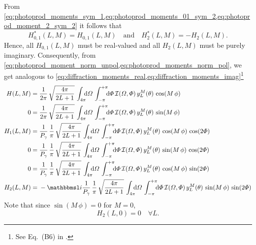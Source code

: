 From
\cref{eq:photoprod_moments_sym_1,eq:photoprod_moments_01_sym_2,eq:photoprod_moment_2_sym_2}
it follows that
\begin{equation}
  \label{eq:photoprodP_moments_real_imag}
  H_{0, 1}^*(L, M) = H_{0, 1}(L, M)
  \quad\text{and}\quad
  H_2^*(L, M) = -H_2(L, M).
\end{equation}
Hence, all $H_{0, 1}(L, M)$ must be real-valued and all $H_2(L, M)$
must be purely imaginary.  Consequently, from
\cref{eq:photoprod_moment_norm_unpol,eq:photoprod_moments_norm_pol},
we get analogous to
\cref{eq:diffraction_moments_real,eq:diffraction_moments_imag}\footnote{See
Eq.~(B6) in .}
\begin{align}
  \label{eq:photoprod_moment_0_real}
  H(L, M)
  ={}& \frac{1}{2 \pi}\, \sqrt{\frac{4 \pi}{2 L + 1}}\, \int_{4 \pi}\!\!\! \dif{\Omega}\, \int_{-\pi}^{+\pi}\!\!\! \dif{\Phi}\,
  \mathcal{I}(\Omega, \Phi)\, y_L^M(\theta)\, \cos(M\, \phi)
  \\
  \label{eq:photoprod_moment_0_imag}
  0
  ={}& \frac{1}{2 \pi}\, \sqrt{\frac{4 \pi}{2 L + 1}}\, \int_{4 \pi}\!\!\! \dif{\Omega}\, \int_{-\pi}^{+\pi}\!\!\! \dif{\Phi}\,
  \mathcal{I}(\Omega, \Phi)\, y_L^M(\theta)\, \sin(M\, \phi)
  \\
  \label{eq:photoprod_moment_1_real}
  H_1(L, M)
  ={}& \frac{1}{P_\gamma}\, \frac{1}{\pi}\, \sqrt{\frac{4 \pi}{2 L + 1}}\, \int_{4 \pi}\!\!\! \dif{\Omega}\, \int_{-\pi}^{+\pi}\!\!\! \dif{\Phi}\,
  \mathcal{I}(\Omega, \Phi)\, y_L^M(\theta)\, \cos(M\, \phi)\, \cos(2 \Phi)
  \\
  \label{eq:photoprod_moment_1_imag}
  0
  ={}& \frac{1}{P_\gamma}\, \frac{1}{\pi}\, \sqrt{\frac{4 \pi}{2 L + 1}}\, \int_{4 \pi}\!\!\! \dif{\Omega}\, \int_{-\pi}^{+\pi}\!\!\! \dif{\Phi}\,
  \mathcal{I}(\Omega, \Phi)\, y_L^M(\theta)\, \sin(M\, \phi)\, \cos(2 \Phi)
  \\
  \label{eq:photoprod_moment_2_real}
  0
  ={}& \frac{1}{P_\gamma}\, \frac{1}{\pi}\, \sqrt{\frac{4 \pi}{2 L + 1}}\, \int_{4 \pi}\!\!\! \dif{\Omega}\, \int_{-\pi}^{+\pi}\!\!\! \dif{\Phi}\,
  \mathcal{I}(\Omega, \Phi)\, y_L^M(\theta)\, \cos(M\, \phi)\, \sin(2 \Phi)
  \\
  \label{eq:photoprod_moment_2_imag}
  H_2(L, M)
  ={}& -\imag \frac{1}{P_\gamma}\, \frac{1}{\pi}\, \sqrt{\frac{4 \pi}{2 L + 1}}\, \int_{4 \pi}\!\!\! \dif{\Omega}\, \int_{-\pi}^{+\pi}\!\!\! \dif{\Phi}\,
  \mathcal{I}(\Omega, \Phi)\, y_L^M(\theta)\, \sin(M\, \phi)\, \sin(2 \Phi)
\end{align}
Note that since $\sin(M\, \phi) = 0$ for $M = 0$,
\begin{equation}
  \label{eq:photoprod_moment_2_M0}
  H_2(L, 0) = 0
  \quad\forall L.
\end{equation}

